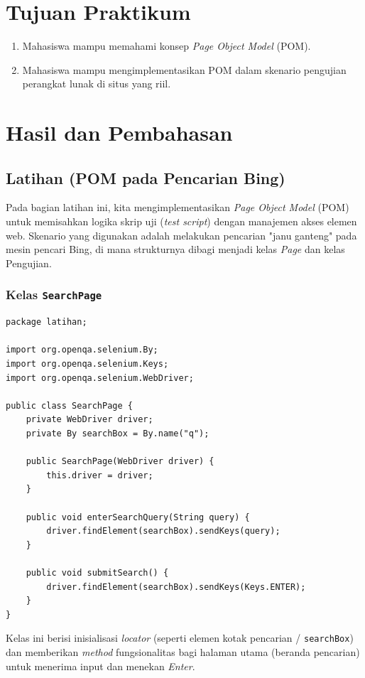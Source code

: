 \documentclass[a4paper,oneside,12pt]{report}
\newcommand{\tocboldsection}[1]{%
  \protect\renewcommand{\protect\cftchapfont}{\protect\bfseries}%
  #1%
  \protect\renewcommand{\protect\cftchapfont}{}%
}
\begin{document}
\chapter[Tujuan Praktikum]{Tujuan Praktikum}
\begin{enumerate}
    \item Mahasiswa mampu memahami konsep \textit{Page Object Model} (POM).
    \item Mahasiswa mampu mengimplementasikan POM dalam skenario pengujian perangkat lunak di situs yang riil.
\end{enumerate}
\clearpage

\chapter[\texorpdfstring{\tocboldsection{Hasil dan Pembahasan}}{Hasil dan Pembahasan}]{Hasil dan Pembahasan}

\section{Latihan (POM pada Pencarian Bing)}

Pada bagian latihan ini, kita mengimplementasikan \textit{Page Object Model} (POM) untuk memisahkan logika skrip uji (\textit{test script}) dengan manajemen akses elemen web. Skenario yang digunakan adalah melakukan pencarian "janu ganteng" pada mesin pencari Bing, di mana strukturnya dibagi menjadi kelas \textit{Page} dan kelas Pengujian.

\subsection{Kelas \texttt{SearchPage}}
\begin{lstlisting}[style=javastyle, caption=Implementasi \texttt{SearchPage.java}]
package latihan;

import org.openqa.selenium.By;
import org.openqa.selenium.Keys;
import org.openqa.selenium.WebDriver;

public class SearchPage {
    private WebDriver driver;
    private By searchBox = By.name("q");

    public SearchPage(WebDriver driver) {
        this.driver = driver;
    }

    public void enterSearchQuery(String query) {
        driver.findElement(searchBox).sendKeys(query);
    }

    public void submitSearch() {
        driver.findElement(searchBox).sendKeys(Keys.ENTER);
    }
}
\end{lstlisting}
Kelas ini berisi inisialisasi \textit{locator} (seperti elemen kotak pencarian / \texttt{searchBox}) dan memberikan \textit{method} fungsionalitas bagi halaman utama (beranda pencarian) untuk menerima input dan menekan \textit{Enter}.
\newpage
\end{document}
